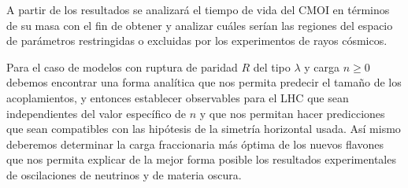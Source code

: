 \begin{ideas}
 A partir de los resultados se analizará el tiempo de vida del CMOI  en términos de su masa con el fin de obtener y analizar cuáles serían las regiones del espacio de parámetros restringidas o excluidas por los experimentos de rayos cósmicos. 



Para el caso de modelos con ruptura de paridad $R$ del tipo $\lambda$ y carga $n\ge 0$ debemos encontrar una forma analítica que nos permita predecir el tamaño de los acoplamientos, y entonces establecer observables para el LHC que sean independientes del valor específico de $n$ y que nos permitan hacer predicciones que sean compatibles con las hipótesis de la simetría horizontal usada. Así mismo deberemos determinar la carga fraccionaria más óptima de los nuevos flavones que nos permita explicar de la mejor forma posible los resultados experimentales de oscilaciones de neutrinos y de materia oscura.
\end{ideas}


